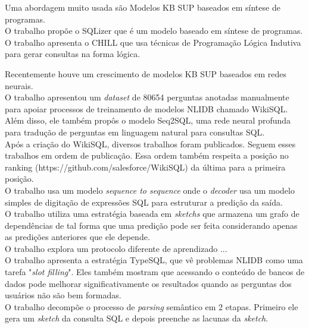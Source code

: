 \documentclass{article}
\begin{document}
Uma abordagem muito usada são Modelos KB SUP baseados em síntese de programas.\\

O trabalho \citep{yaghmazadeh2017sqlizer} propõe o SQLizer que é um modelo baseado em síntese de programas. \\

O trabalho \citep{zelle1996learning} apresenta o CHILL que usa técnicas de Programação Lógica Indutiva para gerar consultas na forma lógica.

Recentemente houve um crescimento de modelos KB SUP baseados em redes neurais.\\

O trabalho \citep{zhong2017seq2sql} apresentou um \textit{dataset} de 80654 perguntas anotadas manualmente para apoiar processos de treinamento de modelos NLIDB chamado WikiSQL. Além disso, ele também propôs o modelo Seq2SQL, uma rede neural profunda para tradução de perguntas em linguagem natural para consultas SQL. \\

Após a criação do WikiSQL, diversos trabalhos foram publicados. Seguem esses trabalhos em ordem de publicação. Essa ordem também respeita a posição no ranking (https://github.com/salesforce/WikiSQL) da última para a primeira posição.\\

O trabalho \citep{wang2018pointing} usa um modelo \textit{sequence to sequence} onde o \textit{decoder} usa um modelo simples de digitação de expressões SQL para estruturar a predição da saída. \\

O trabalho \citep{xu2017sqlnet} utiliza uma estratégia baseada em \textit{sketchs} que armazena um grafo de dependências de tal forma que uma predição pode ser feita considerando apenas as predições anteriores que ele depende. \\

O trabalho \citep{huang2018natural} explora um protocolo diferente de aprendizado ... \\

O trabalho \citep{yu2018typesql} apresenta a estratégia TypeSQL, que vê problemas NLIDB como uma tarefa "\textit{slot filling}". Eles também mostram que acessando o conteúdo de bancos de dados pode melhorar significativamente os resultados quando as perguntas dos usuários não são bem formadas. \\

O trabalho \citep{dong2018coarse} decompõe o processo de \textit{parsing} semântico em 2 etapas. Primeiro ele gera um \textit{sketch} da consulta SQL e depois preenche as lacunas da \textit{sketch}. \\
\end{document}
